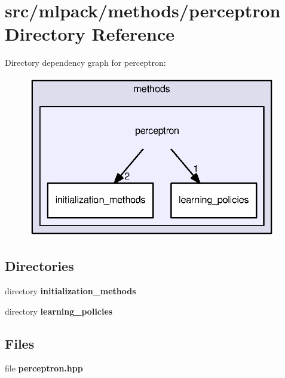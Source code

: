\section{src/mlpack/methods/perceptron Directory Reference}
\label{dir_bf4201a1cff29d7e18935cf6aeb09d34}
Directory dependency graph for perceptron\+:
\nopagebreak
\begin{figure}[H]
\begin{center}
\leavevmode
\includegraphics[width=309pt]{dir_bf4201a1cff29d7e18935cf6aeb09d34_dep}
\end{center}
\end{figure}
\subsection*{Directories}
\begin{DoxyCompactItemize}
\item 
directory {\bf initialization\+\_\+methods}
\item 
directory {\bf learning\+\_\+policies}
\end{DoxyCompactItemize}
\subsection*{Files}
\begin{DoxyCompactItemize}
\item 
file {\bf perceptron.\+hpp}
\end{DoxyCompactItemize}
